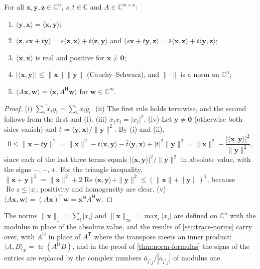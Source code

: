 \begin{proposition}
\label{prop:hermitian-inner-product}
For all $\mathbf x,\mathbf y,\mathbf z\in\mathbb C^n$, $s,t\in\mathbb C$ and $A\in\mathbb C^{m\times n}$:
\begin{enumerate}
\item $\langle\mathbf y,\mathbf x\rangle=\overline{\langle\mathbf x,\mathbf y\rangle}$;
\item $\langle\mathbf z,s\mathbf x+t\mathbf y\rangle=s\langle\mathbf z,\mathbf x\rangle+t\langle\mathbf z,\mathbf y\rangle$ and $\langle s\mathbf x+t\mathbf y,\mathbf z\rangle=\bar s\langle\mathbf x,\mathbf z\rangle+\bar t\langle\mathbf y,\mathbf z\rangle$;
\item $\langle\mathbf x,\mathbf x\rangle$ is real and positive for $\mathbf x\ne\mathbf 0$;
\item $|\langle\mathbf x,\mathbf y\rangle|\le\|\mathbf x\|\|\mathbf y\|$ (Cauchy--Schwarz), and $\|\cdot\|$ is a norm on $\mathbb C^n$;
\item $\langle A\mathbf x,\mathbf w\rangle=\langle\mathbf x,A^{\mathsf H}\mathbf w\rangle$ for $\mathbf w\in\mathbb C^m$.
\end{enumerate}
\end{proposition}

\begin{proof}
(i) $\overline{\sum_i\bar x_iy_i}=\sum_ix_i\bar y_i$. (ii) The first rule holds termwise, and the second follows from the first and (i). (iii) $\bar x_ix_i=|x_i|^2$. (iv) Let $\mathbf y\ne\mathbf 0$ (otherwise both sides vanish) and $t\coloneqq\langle\mathbf y,\mathbf x\rangle/\|\mathbf y\|^2$. By (i) and (ii),
\[
0\le\|\mathbf x-t\mathbf y\|^2=\|\mathbf x\|^2-t\langle\mathbf x,\mathbf y\rangle-\bar t\langle\mathbf y,\mathbf x\rangle+|t|^2\|\mathbf y\|^2=\|\mathbf x\|^2-\frac{|\langle\mathbf x,\mathbf y\rangle|^2}{\|\mathbf y\|^2},
\]
since each of the last three terms equals $|\langle\mathbf x,\mathbf y\rangle|^2/\|\mathbf y\|^2$ in absolute value, with the signs $-,-,+$. For the triangle inequality, $\|\mathbf x+\mathbf y\|^2=\|\mathbf x\|^2+2\operatorname{Re}\langle\mathbf x,\mathbf y\rangle+\|\mathbf y\|^2\le(\|\mathbf x\|+\|\mathbf y\|)^2$, because $\operatorname{Re}z\le|z|$; positivity and homogeneity are clear. (v) $\langle A\mathbf x,\mathbf w\rangle=(A\mathbf x)^{\mathsf H}\mathbf w=\mathbf x^{\mathsf H}A^{\mathsf H}\mathbf w$.
\end{proof}

The norms $\|\mathbf x\|_1=\sum_i|x_i|$ and $\|\mathbf x\|_\infty=\max_i|x_i|$ are defined on $\mathbb C^n$ with the modulus in place of the absolute value, and the results of \cref{sec:trace-norms} carry over, with $A^{\mathsf H}$ in place of $A^{\mathsf T}$ where the transpose meets an inner product: $\langle A,B\rangle_{\mathrm F}=\operatorname{tr}(A^{\mathsf H}B)$, and in the proof of \cref{thm:norm-formulas} the signs of the entries are replaced by the complex numbers $\bar a_{i^*j}/|a_{i^*j}|$ of modulus one.

